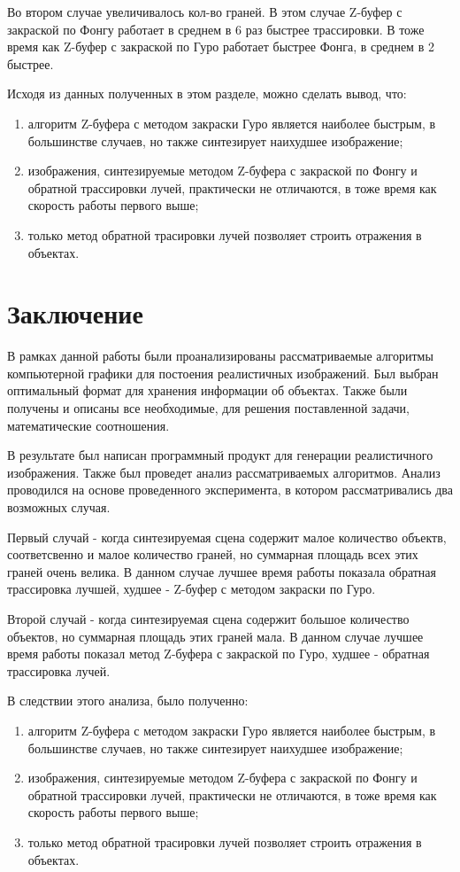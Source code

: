 \documentclass[12pt]{report}
\begin{document}
	Во втором случае увеличивалось кол-во граней. В этом случае Z-буфер с закраской по Фонгу работает в среднем в 6 раз быстрее трассировки.
	В тоже время как Z-буфер с закраской по Гуро работает быстрее Фонга, в среднем в 2 быстрее.
	
	Исходя из данных полученных в этом разделе, можно сделать вывод, что:
	\begin{enumerate}
		\item алгоритм Z-буфера с методом закраски Гуро является наиболее быстрым, в большинстве случаев, но также синтезирует наихудшее изображение;
		\item изображения, синтезируемые методом Z-буфера с закраской по Фонгу и обратной трассировки лучей, практически не отличаются, в тоже время как скорость работы первого выше;
		\item только метод обратной трасировки лучей позволяет строить отражения в объектах.
	\end{enumerate}
	
	\chapter*{Заключение}

	В рамках данной работы были проанализированы рассматриваемые алгоритмы компьютерной графики для постоения реалистичных изображений. Был выбран оптимальный формат для хранения информации об объектах. Также были получены и описаны все необходимые, для решения поставленной задачи, математические соотношения.
	
	В результате был написан программный продукт для генерации реалистичного изображения. Также был проведет анализ рассматриваемых алгоритмов. Анализ проводился на основе проведенного эксперимента, в котором рассматривались два возможных случая.
	
	Первый случай - когда синтезируемая сцена содержит малое количество объектв, соответсвенно и малое количество граней, но суммарная площадь всех этих граней очень велика. В данном случае лучшее время работы показала обратная трассировка лучшей, худшее - Z-буфер с методом закраски по Гуро.
	
	Второй случай - когда синтезируемая сцена содержит большое количество объектов, но суммарная площадь этих граней мала. В данном случае лучшее время работы показал метод Z-буфера с закраской по Гуро, худшее - обратная трассировка лучей.
	
	В следствии этого анализа, было полученно:
	\begin{enumerate}
		\item алгоритм Z-буфера с методом закраски Гуро является наиболее быстрым, в большинстве случаев, но также синтезирует наихудшее изображение;
		\item изображения, синтезируемые методом Z-буфера с закраской по Фонгу и обратной трассировки лучей, практически не отличаются, в тоже время как скорость работы первого выше;
		\item только метод обратной трасировки лучей позволяет строить отражения в объектах.
	\end{enumerate}

	
	 
\end{document}

